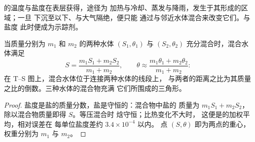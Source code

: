 的温度与盐度在表层获得，途径为
加热与冷却、蒸发与降雨，发生于其形成的区域；一旦
下沉至以下、与大气隔绝，便只能
通过与邻近水体混合来改变它们。与盐度
此时便成为示踪剂。

\begin{proposition}[混合线是直线]\label{prop:b1:fluid-envelopes-structure:mixing}
当质量分别为 $m_1$ 和 $m_2$ 的两种水体 $(S_1, \theta_1)$ 与 $(S_2, \theta_2)$
充分混合时，混合水体满足
\[
  S = \frac{m_1 S_1 + m_2 S_2}{m_1 + m_2},\qquad
  \theta \approx \frac{m_1 \theta_1 + m_2 \theta_2}{m_1 + m_2}:
\]
在 T--S 图上，混合水体位于连接两种水体的线段上，
与两者的距离之比为其质量之比的倒数。三种水体的混合物充满
它们所围成的三角形。
\end{proposition}

\begin{proof}
盐度是盐的质量分数，盐是守恒的：混合物中盐的
质量为 $m_1 S_1 + m_2 S_2$，除以混合物质量即得 $S$。等压混合时
焓守恒；比热变化不大时，
这便是的加权平均，相对误差在
每单位盐度差约 $3.4\times10^{-4}$ 以内。
点 $(S, \theta)$ 即为两点的重心，权重分别为
$m_1$ 与 $m_2$。
\end{proof}

